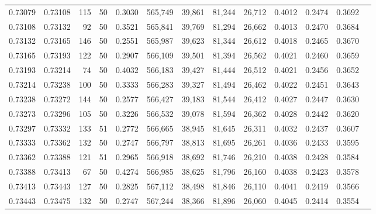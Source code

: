 \begin{tabular}{rrrrrrrrrrrrr}
0.73079 & 0.73108 &   115 &  50 &                                     0.3030 & 565,749 &  39,861 &  81,244 &  26,712 & 0.4012 & 0.2474 & 0.3692 \\
0.73108 & 0.73132 &    92 &  50 &                                     0.3521 & 565,841 &  39,769 &  81,294 &  26,662 & 0.4013 & 0.2470 & 0.3684 \\
0.73132 & 0.73165 &   146 &  50 &                                     0.2551 & 565,987 &  39,623 &  81,344 &  26,612 & 0.4018 & 0.2465 & 0.3670 \\
0.73165 & 0.73193 &   122 &  50 &                                     0.2907 & 566,109 &  39,501 &  81,394 &  26,562 & 0.4021 & 0.2460 & 0.3659 \\
0.73193 & 0.73214 &    74 &  50 &                                     0.4032 & 566,183 &  39,427 &  81,444 &  26,512 & 0.4021 & 0.2456 & 0.3652 \\
0.73214 & 0.73238 &   100 &  50 &                                     0.3333 & 566,283 &  39,327 &  81,494 &  26,462 & 0.4022 & 0.2451 & 0.3643 \\
0.73238 & 0.73272 &   144 &  50 &                                     0.2577 & 566,427 &  39,183 &  81,544 &  26,412 & 0.4027 & 0.2447 & 0.3630 \\
0.73273 & 0.73296 &   105 &  50 &                                     0.3226 & 566,532 &  39,078 &  81,594 &  26,362 & 0.4028 & 0.2442 & 0.3620 \\
0.73297 & 0.73332 &   133 &  51 &                                     0.2772 & 566,665 &  38,945 &  81,645 &  26,311 & 0.4032 & 0.2437 & 0.3607 \\
0.73333 & 0.73362 &   132 &  50 &                                     0.2747 & 566,797 &  38,813 &  81,695 &  26,261 & 0.4036 & 0.2433 & 0.3595 \\
0.73362 & 0.73388 &   121 &  51 &                                     0.2965 & 566,918 &  38,692 &  81,746 &  26,210 & 0.4038 & 0.2428 & 0.3584 \\
0.73388 & 0.73413 &    67 &  50 &                                     0.4274 & 566,985 &  38,625 &  81,796 &  26,160 & 0.4038 & 0.2423 & 0.3578 \\
0.73413 & 0.73443 &   127 &  50 &                                     0.2825 & 567,112 &  38,498 &  81,846 &  26,110 & 0.4041 & 0.2419 & 0.3566 \\
0.73443 & 0.73475 &   132 &  50 &                                     0.2747 & 567,244 &  38,366 &  81,896 &  26,060 & 0.4045 & 0.2414 & 0.3554 \\

\end{tabular}
